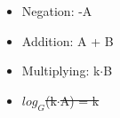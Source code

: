 \begin{itemize}
  \item Negation: -A
  \item Addition: A + B
  \item Multiplying: k$\cdot$B
  \item \sout{$log_{G}$(k$\cdot$A) = k}
\end{itemize}
